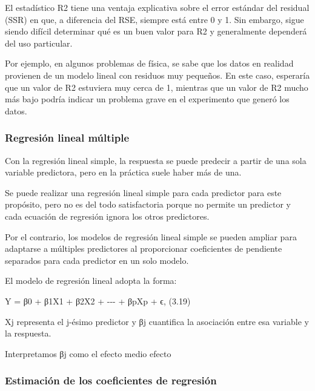 \documentclass[
  letterpaper,
  DIV=11,
  numbers=noendperiod]{scrartcl}
\begin{document}
El estadístico R2 tiene una ventaja explicativa sobre el error estándar
del residual (SSR) en que, a diferencia del RSE, siempre está entre 0 y
1. Sin embargo, sigue siendo difícil determinar qué es un buen valor
para R2 y generalmente dependerá del uso particular.

Por ejemplo, en algunos problemas de física, se sabe que los datos en
realidad provienen de un modelo lineal con residuos muy pequeños. En
este caso, esperaría que un valor de R2 estuviera muy cerca de 1,
mientras que un valor de R2 mucho más bajo podría indicar un problema
grave en el experimento que generó los datos.

\hypertarget{regresiuxf3n-lineal-muxfaltiple}{%
\subsubsection{\texorpdfstring{\textbf{Regresión lineal
múltiple}}{Regresión lineal múltiple}}\label{regresiuxf3n-lineal-muxfaltiple}}

Con la regresión lineal simple, la respuesta se puede predecir a partir
de una sola variable predictora, pero en la práctica suele haber más de
una.

Se puede realizar una regresión lineal simple para cada predictor para
este propósito, pero no es del todo satisfactoria porque no permite un
predictor y cada ecuación de regresión ignora los otros predictores.

Por el contrario, los modelos de regresión lineal simple se pueden
ampliar para adaptarse a múltiples predictores al proporcionar
coeficientes de pendiente separados para cada predictor en un solo
modelo.

El modelo de regresión lineal adopta la forma:

Y = β0 + β1X1 + β2X2 + -\/-\/- + βpXp + ϵ, (3.19)

Xj representa el j-ésimo predictor y βj cuantifica la asociación entre
esa variable y la respuesta.

Interpretamos βj como el efecto medio efecto

\hypertarget{estimaciuxf3n-de-los-coeficientes-de-regresiuxf3n}{%
\subsubsection{\texorpdfstring{\textbf{Estimación de los coeficientes de
regresión}}{Estimación de los coeficientes de regresión}}\label{estimaciuxf3n-de-los-coeficientes-de-regresiuxf3n}}
\end{document}
